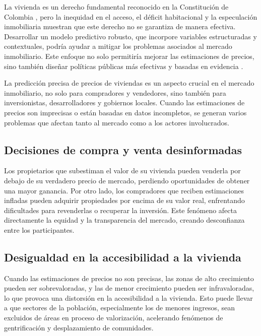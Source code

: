 

La vivienda es un derecho fundamental reconocido en la Constitución de Colombia \cite{ConstitucionPoliticaColombia1991}, pero la inequidad en el acceso, el déficit habitacional y la especulación inmobiliaria muestran que este derecho no se garantiza de manera efectiva. Desarrollar un modelo predictivo robusto, que incorpore variables estructuradas y contextuales, podría ayudar a mitigar los problemas asociados al mercado inmobiliario. Este enfoque no solo permitiría mejorar las estimaciones de precios, sino también diseñar políticas públicas más efectivas y basadas en evidencia \cite{fortaleciendoVivienda2024, castillo2004anotaciones, coyunturaVivienda2023}.

La predicción precisa de precios de viviendas es un aspecto crucial en el mercado inmobiliario, no solo para compradores y vendedores, sino también para inversionistas, desarrolladores y gobiernos locales. Cuando las estimaciones de precios son imprecisas o están basadas en datos incompletos, se generan varios problemas que afectan tanto al mercado como a los actores involucrados.

\subsection*{Decisiones de compra y venta desinformadas}
Los propietarios que subestiman el valor de su vivienda pueden venderla por debajo de su verdadero precio de mercado, perdiendo oportunidades de obtener una mayor ganancia. Por otro lado, los compradores que reciben estimaciones infladas pueden adquirir propiedades por encima de su valor real, enfrentando dificultades para revenderlas o recuperar la inversión. Este fenómeno afecta directamente la equidad y la transparencia del mercado, creando desconfianza entre los participantes.

\subsection*{Desigualdad en la accesibilidad a la vivienda}
Cuando las estimaciones de precios no son precisas, las zonas de alto crecimiento pueden ser sobrevaloradas, y las de menor crecimiento pueden ser infravaloradas, lo que provoca una distorsión en la accesibilidad a la vivienda. Esto puede llevar a que sectores de la población, especialmente los de menores ingresos, sean excluidos de áreas en proceso de valorización, acelerando fenómenos de gentrificación y desplazamiento de comunidades.

